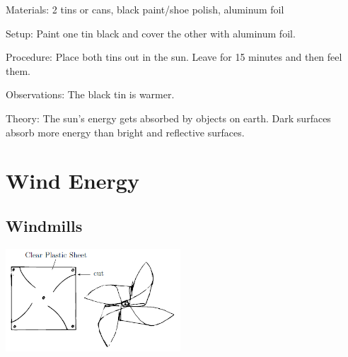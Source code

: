 \begin{multicols}{2}
\begin{description*}
\item[Materials:]{2 tins or cans, black paint/shoe polish, aluminum foil}
\item[Setup:]{Paint one tin black and cover the other with aluminum foil.}
\item[Procedure:]{Place both tins out in the sun. Leave for 15 minutes and then feel them.}
\item[Observations:]{The black tin is warmer.}
\item[Theory:]{The sun's energy gets absorbed by objects on earth. Dark surfaces absorb more energy than bright and reflective surfaces.}
\end{description*}


\section*{Wind Energy} 


\subsection{Windmills} 

\begin{center}
\includegraphics[width=0.49\textwidth]{./img/windmill.png}
\end{center}


\end{multicols}
